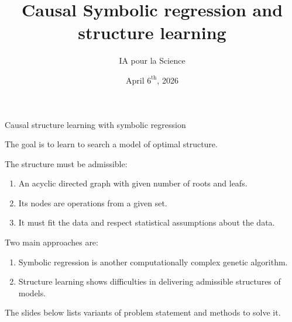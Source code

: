 \documentclass{beamer}
\title{Causal Symbolic regression and structure learning}
\author{IA pour la Science}
\date{April $6^\text{th}$, 2026}
\begin{document}
\begin{frame}
  \titlepage
\end{frame}
\begin{frame}{Causal structure learning with symbolic regression}

The goal is to learn to search a model of optimal structure.

\medskip
{\color{blue}The structure must be admissible:}
    \begin{enumerate}
        \item An acyclic directed graph with given number of roots and leafs.
        \item Its nodes are operations from a given set.
        \item It must fit the data and respect statistical assumptions about the data.
    \end{enumerate}

\medskip
{\color{blue}Two main approaches are:}
    \begin{enumerate}
        \item Symbolic regression is another computationally complex genetic algorithm.
        \item Structure learning shows difficulties in delivering admissible structures of models.
    \end{enumerate}

The slides below lists variants of problem statement and methods to solve it.
\end{frame}
\end{document}
